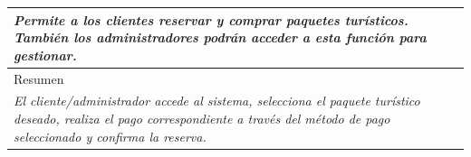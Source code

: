\begin{table}[H]
\begin{tabular}{|llllllll|}
    \multicolumn{8}{|p{15cm}|}{{\color[HTML]{808080} \textit{Permite a los clientes reservar y comprar paquetes tur\'isticos. Tambi\'en los administradores podr\'an acceder a esta funci\'on para gestionar.}}}                                                                                                                                                                                       \\ \hline
    \multicolumn{8}{|l|}{Resumen}                                                                                                                                                                                                                                           \\ \hline
    \multicolumn{8}{|p{15cm}|}{{\color[HTML]{808080} \textit{El cliente/administrador accede al sistema, selecciona el paquete tur\'istico deseado, realiza el pago correspondiente a trav\'es del m\'etodo de pago seleccionado y confirma la reserva.}}} \\ \hline
    \end{tabular}
\end{table}

